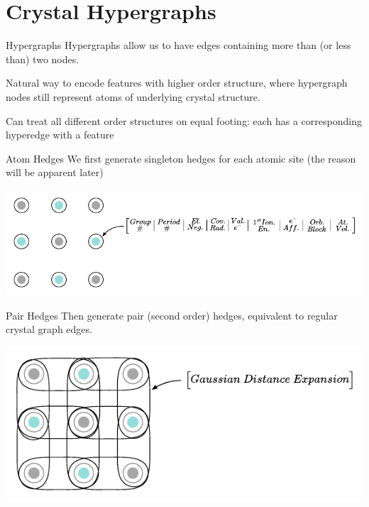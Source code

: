 \documentclass[11pt]{beamer}
\begin{document}
\section{Crystal Hypergraphs}
\begin{frame}{Hypergraphs}
Hypergraphs allow us to have edges containing more than (or less than) two nodes.

\vspace{.5cm}

Natural way to encode features with higher order structure, where hypergraph nodes still represent atoms of underlying crystal structure.

\vspace{.5cm}

Can treat all different order structures on equal footing: each has a corresponding hyperedge with a feature
\end{frame}

\begin{frame}{Atom Hedges}
We first generate singleton hedges for each atomic site (the reason will be apparent later)

\vspace{0.5cm}

\begin{center}
\includegraphics[scale=0.73]{singleton.pdf}
\end{center}

\end{frame}

\begin{frame}{Pair Hedges}
Then generate pair (second order) hedges, equivalent to regular crystal graph edges.

\vspace{0.5cm}

\begin{center}
\includegraphics[scale=0.73]{pair.pdf}
\end{center}

\end{frame}
\end{document}
